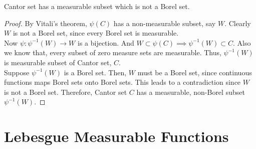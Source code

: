 \begin{theorem}
	Cantor set has a measurable subset which is not a Borel set.
\end{theorem}
\begin{proof}
	By Vitali's theorem, $\psi(C)$ has a non-measurable subset, say $W$.
	Clearly $W$ is not a Borel set, since every Borel set is measurable.\\

	Now $\psi : \psi^{-1}(W) \to W$ is a bijection.
	And $W \subset \psi(C) \implies \psi^{-1}(W) \subset C$.
	Also we know that, every subset of zero measure sets are measurable.
	Thus, $\psi^{-1}(W)$ is measurable subset of Cantor set, $C$.\\

	Suppose $\psi^{-1}(W)$ is a Borel set.
	Then, $W$ must be a Borel set, since continuous functions maps Borel sets onto Borel sets.
	This leads to a contradiction since $W$ is not a Borel set.
	Therefore, Cantor set $C$ has a measurable, non-Borel subset $\psi^{-1}(W)$.
\end{proof}

\section{Lebesgue Measurable Functions}
